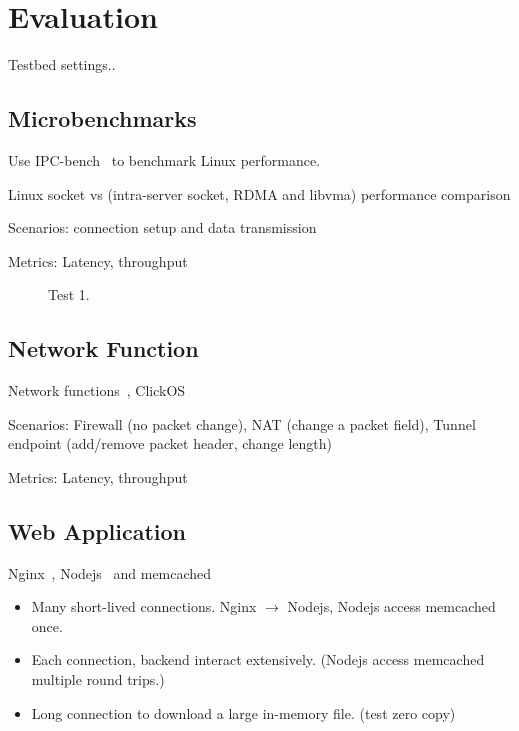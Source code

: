 \section{Evaluation}
\label{sec:evaluation}

Testbed settings..

\subsection{Microbenchmarks}

Use IPC-bench~\cite{ipc-bench} to benchmark Linux performance.

Linux socket vs \sys (intra-server socket, RDMA and libvma) performance comparison

Scenarios: connection setup and data transmission

Metrics: Latency, throughput
\begin{figure}[t]
	\centering
	
	\caption{Test 1.}
	\label{fig:eval-messagesize}
\end{figure}

\subsection{Network Function}

Network functions~\cite{li2016clicknp}, ClickOS~\cite{martins2014clickos}

Scenarios: Firewall (no packet change), NAT (change a packet field), Tunnel endpoint (add/remove packet header, change length)

Metrics: Latency, throughput


\subsection{Web Application}

Nginx~\cite{nginx}, Nodejs~\cite{nodejs} and memcached~\cite{memcached}

\begin{itemize}
	\item Many short-lived connections. Nginx $\rightarrow$ Nodejs, Nodejs access memcached once.
	\item Each connection, backend interact extensively. (Nodejs access memcached multiple round trips.)
	\item Long connection to download a large in-memory file. (test zero copy)
\end{itemize}


